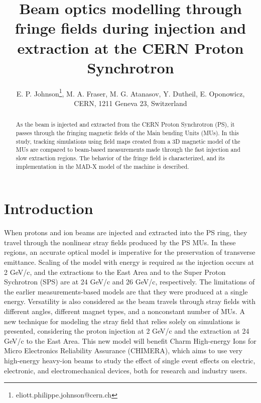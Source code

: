 \documentclass[a4paper,
               biblatex,     %
               keeplastbox,   %
               ]{jacow}
\begin{document}
\title{Beam optics modelling through fringe fields during injection and extraction at the CERN Proton Synchrotron}

\author{E. P. Johnson\thanks{eliott.philippe.johnson@cern.ch}, M. A. Fraser, M. G. Atanasov, Y. Dutheil, E. Oponowicz,\\ CERN, 1211 Geneva 23, Switzerland}
	
\maketitle

%
\begin{abstract}
As the beam is injected and extracted from the CERN Proton Synchrotron (PS), it passes through the fringing magnetic fields of the Main bending Units (MUs). In this study, tracking simulations using field maps created from a 3D magnetic model of the MUs are compared to beam-based measurements made through the fast injection and slow extraction regions. The behavior of the fringe field is characterized, and its implementation in the MAD-X model of the machine is described.
\end{abstract}


\section{Introduction}
When protons and ion beams are injected and extracted into the PS ring, they travel through the nonlinear stray fields produced by the PS MUs. In these regions, an accurate optical model is imperative for the preservation of transverse emittance. Scaling of the model with energy is required as the injection occurs at 2 GeV/c, and the extractions to the East Area and to the Super Proton Sychrotron (SPS) are at 24 GeV/c and 26 GeV/c, respectively. The limitations of the earlier measurements-based models are that they were produced at a single energy. Versatility is also considered as the beam travels through stray fields with different angles, different magnet types, and a nonconstant number of MUs. A new technique for modeling the stray field that relies solely on simulations is presented, considering the proton injection at 2 GeV/c and the extraction at 24 GeV/c to the East Area. This new model will benefit Charm High-energy Ions for Micro Electronics Reliability Assurance (CHIMERA), which aims to use very high-energy heavy-ion beams to study the effect of single event effects on electric, electronic, and electromechanical devices, both for research and industry users.
\end{document}
